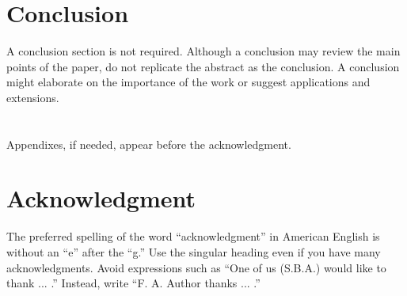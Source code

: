 \documentclass[journal,a4paper,onecolumn]{IEEEtran}
\begin{document}
\section{Conclusion}

A conclusion section is not required. Although a conclusion may review the main points of the paper, do not replicate the abstract as the conclusion. A conclusion might elaborate on the importance of the work or suggest applications and extensions.


%

\appendices
\section{}
Appendixes, if needed, appear before the acknowledgment.

\section*{Acknowledgment}

The preferred spelling of the word ``acknowledgment'' in American English is without an ``e'' after the ``g.'' Use the singular heading even if you have many acknowledgments. Avoid expressions such as ``One of us (S.B.A.) would like to thank ... .'' Instead, write ``F. A. Author thanks ... .''
\end{document}
